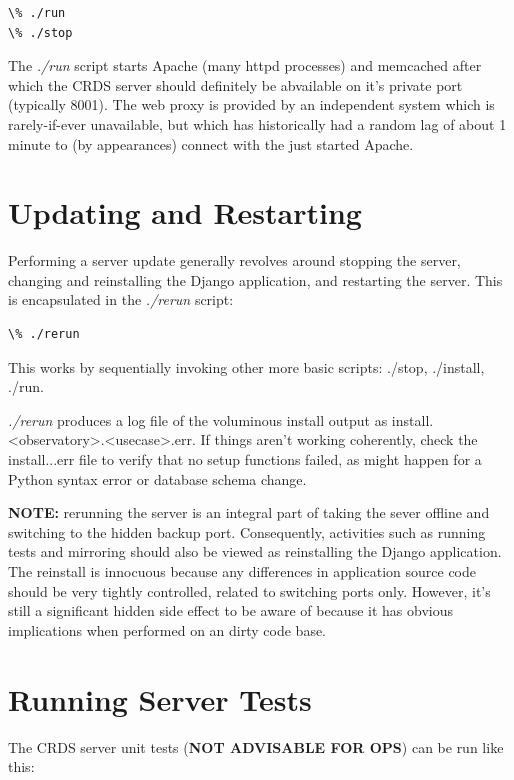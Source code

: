 \documentclass[letterpaper,10pt,english]{sphinxmanual}
\begin{document}
\begin{Verbatim}[commandchars=\\\{\}]
\% ./run
\% ./stop
\end{Verbatim}

The \emph{./run} script starts Apache (many httpd processes) and memcached after which the CRDS server should definitely
be abvailable on it's private port (typically 8001).   The web proxy is provided by an independent system which
is rarely-if-ever unavailable,  but which has historically had a random lag of about 1 minute to (by appearances)
connect with the just started Apache.


\section{Updating and Restarting}
\label{server_guide:updating-and-restarting}
Performing a server update generally revolves around stopping the server,  changing and reinstalling the Django
application, and restarting the server.   This is encapsulated in the \emph{./rerun} script:

\begin{Verbatim}[commandchars=\\\{\}]
\% ./rerun
\end{Verbatim}

This works by sequentially invoking other more basic scripts: ./stop, ./install, ./run.

\emph{./rerun} produces a log file of the voluminous install output as install.\textless{}observatory\textgreater{}.\textless{}usecase\textgreater{}.err.  If things
aren't working coherently,  check the install...err file to verify that no setup functions failed,  as might
happen for a Python syntax error or database schema change.

\textbf{NOTE:}  rerunning the server is an integral part of taking the sever offline and switching to the hidden backup port.
Consequently,  activities such as running tests and mirroring should also be viewed as reinstalling the Django
application.   The reinstall is innocuous because any differences in application source code should be very tightly
controlled, related to switching ports only.   However,  it's still a significant hidden side effect to be aware of
because it has obvious implications when performed on an dirty code base.


\section{Running Server Tests}
\label{server_guide:running-server-tests}
The CRDS server unit tests (\textbf{NOT ADVISABLE FOR OPS}) can be run like this:
\end{document}
